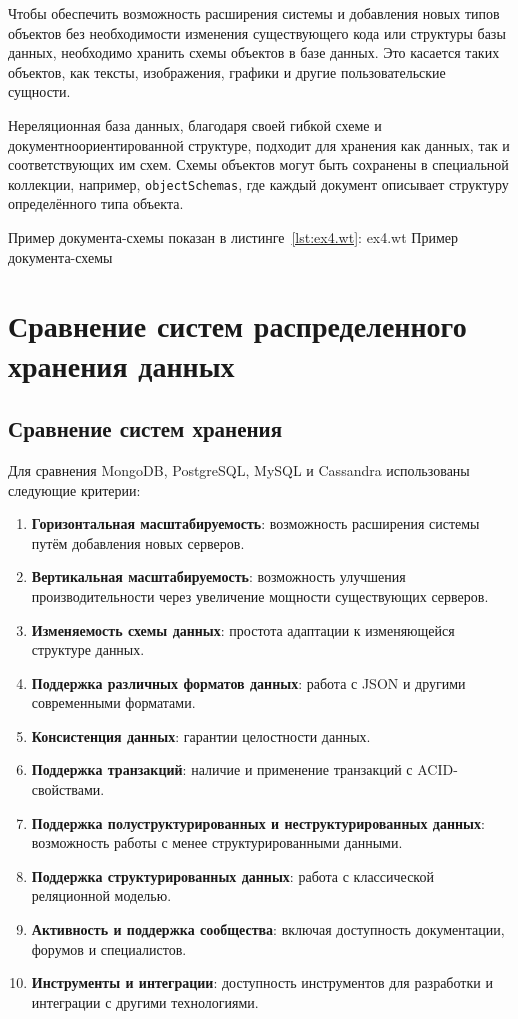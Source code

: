 Чтобы обеспечить возможность расширения системы и добавления новых типов объектов без необходимости изменения существующего кода или структуры базы данных, необходимо хранить схемы объектов в базе данных. 
Это касается таких объектов, как тексты, изображения, графики и другие пользовательские сущности.

Нереляционная база данных, благодаря своей гибкой схеме и документноориентированной структуре, подходит для хранения как данных, так и соответствующих им схем.
Схемы объектов могут быть сохранены в специальной коллекции, например, \texttt{objectSchemas}, где каждый документ описывает структуру определённого типа объекта.

Пример документа-схемы показан в листинге~\ref{lst:ex4.wt}:
	{ex4.wt}
	{Пример документа-схемы}

\clearpage

\section{Сравнение систем распределенного хранения данных}

\subsection{Сравнение систем хранения}

Для сравнения MongoDB, PostgreSQL, MySQL и Cassandra использованы следующие критерии:

\begin{enumerate}[wide=12.5mm, leftmargin=12.5mm]
    \item \textbf{Горизонтальная масштабируемость}: возможность расширения системы путём добавления новых серверов.
    \item \textbf{Вертикальная масштабируемость}: возможность улучшения производительности через увеличение мощности существующих серверов.
    \item \textbf{Изменяемость схемы данных}: простота адаптации к изменяющейся структуре данных.
    \item \textbf{Поддержка различных форматов данных}: работа с JSON и другими современными форматами.
    \item \textbf{Консистенция данных}: гарантии целостности данных.
    \item \textbf{Поддержка транзакций}: наличие и применение транзакций с ACID-свойствами.
    \item \textbf{Поддержка полуструктурированных и неструктурированных данных}: возможность работы с менее структурированными данными.
    \item \textbf{Поддержка структурированных данных}: работа с классической реляционной моделью.
    \item \textbf{Активность и поддержка сообщества}: включая доступность документации, форумов и специалистов.
    \item \textbf{Инструменты и интеграции}: доступность инструментов для разработки и интеграции с другими технологиями.
\end{enumerate}

